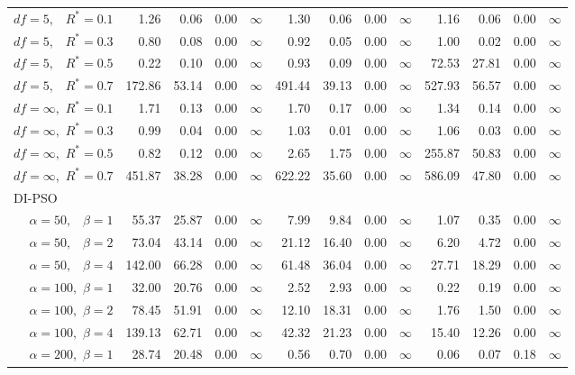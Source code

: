 \documentclass[cmbright]{staauth}
\begin{document}
\begin{table}[ht]
{\begin{tabular}{r|rrrr|rrrr|rrrr}
  $df = 5,\enspace$ $R^* =0.1$ & 1.26 & 0.06 & 0.00 & $\infty$ & 1.30 & 0.06 & 0.00 & $\infty$ & 1.16 & 0.06 & 0.00 & $\infty$ \\
  $df = 5,\enspace$ $R^* =0.3$ & 0.80 & 0.08 & 0.00 & $\infty$ & 0.92 & 0.05 & 0.00 & $\infty$ & 1.00 & 0.02 & 0.00 & $\infty$ \\
  $df = 5,\enspace$ $R^* =0.5$ & 0.22 & 0.10 & 0.00 & $\infty$ & 0.93 & 0.09 & 0.00 & $\infty$ & 72.53 & 27.81 & 0.00 & $\infty$ \\
  $df = 5,\enspace$ $R^* =0.7$ & 172.86 & 53.14 & 0.00 & $\infty$ & 491.44 & 39.13 & 0.00 & $\infty$ & 527.93 & 56.57 & 0.00 & $\infty$ \\
  $df = \infty,$ $R^* =0.1$ & 1.71 & 0.13 & 0.00 & $\infty$ & 1.70 & 0.17 & 0.00 & $\infty$ & 1.34 & 0.14 & 0.00 & $\infty$ \\
  $df = \infty,$ $R^* =0.3$ & 0.99 & 0.04 & 0.00 & $\infty$ & 1.03 & 0.01 & 0.00 & $\infty$ & 1.06 & 0.03 & 0.00 & $\infty$ \\
  $df = \infty,$ $R^* =0.5$ & 0.82 & 0.12 & 0.00 & $\infty$ & 2.65 & 1.75 & 0.00 & $\infty$ & 255.87 & 50.83 & 0.00 & $\infty$ \\
  $df = \infty,$ $R^* =0.7$ & 451.87 & 38.28 & 0.00 & $\infty$ & 622.22 & 35.60 & 0.00 & $\infty$ & 586.09 & 47.80 & 0.00 & $\infty$ \\
\hline
\multicolumn{1}{l|}{DI-PSO} &&&&&&&&&&&&\\
  $\alpha = 50,\enspace$ $\beta =1$ & 55.37 & 25.87 & 0.00 & $\infty$ & 7.99 & 9.84 & 0.00 & $\infty$ & 1.07 & 0.35 & 0.00 & $\infty$ \\
  $\alpha = 50,\enspace$ $\beta =2$ & 73.04 & 43.14 & 0.00 & $\infty$ & 21.12 & 16.40 & 0.00 & $\infty$ & 6.20 & 4.72 & 0.00 & $\infty$ \\
  $\alpha = 50,\enspace$ $\beta =4$ & 142.00 & 66.28 & 0.00 & $\infty$ & 61.48 & 36.04 & 0.00 & $\infty$ & 27.71 & 18.29 & 0.00 & $\infty$ \\
  $\alpha = 100,$ $\beta =1$ & 32.00 & 20.76 & 0.00 & $\infty$ & 2.52 & 2.93 & 0.00 & $\infty$ & 0.22 & 0.19 & 0.00 & $\infty$ \\
  $\alpha = 100,$ $\beta =2$ & 78.45 & 51.91 & 0.00 & $\infty$ & 12.10 & 18.31 & 0.00 & $\infty$ & 1.76 & 1.50 & 0.00 & $\infty$ \\
  $\alpha = 100,$ $\beta =4$ & 139.13 & 62.71 & 0.00 & $\infty$ & 42.32 & 21.23 & 0.00 & $\infty$ & 15.40 & 12.26 & 0.00 & $\infty$ \\
  $\alpha = 200,$ $\beta =1$ & 28.74 & 20.48 & 0.00 & $\infty$ & 0.56 & 0.70 & 0.00 & $\infty$ & 0.06 & 0.07 & 0.18 & $\infty$ \\

\end{tabular}}
\end{table}
\end{document}
